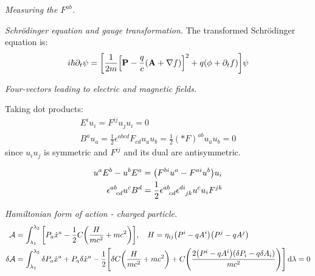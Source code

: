 \documentclass{report}
\begin{document}
\begin{subquests}
	\item \emph{Measuring the $F^{ab}$.}

	\item \emph{Schr\"odinger equation and gauge transformation.}
	The transformed Schr\"odinger equation is:
	\begin{align*}
		i\hbar\partial_t \psi = \bqty{\frac{1}{2m}\bqty{\mathbf{P} - \frac{q}{c}\pqty{\mathbf A + \nabla f}}^2 + q\pqty{\phi + \partial_t f}}\psi
	\end{align*}

	\item \emph{Four-vectors leading to electric and magnetic fields.}
	\begin{subquests}
		\item Taking dot products:
		\begin{gather*}
			E^i u_i = F^{ij}u_j u_i = 0 \\
			B^a u_a = \frac{1}{2}\epsilon^{abcd}F_{cd}u_a u_b = \frac{1}{2}(*F)^{ab}u_a u_b = 0
		\end{gather*}
		since $u_i u_j$ is symmetric and $F^{ij}$ and its dual are antisymmetric.

		\item
		\begin{align*}
			u^a E^b - u^b E^a & = \pqty{F^{bi}u^a - F^{ai}u^b} u_i \\
			\epsilon^{ab}_{\;\;\;cd} u^c B^d & = \frac{1}{2}\epsilon^{ab}_{\;\;\;cd}\epsilon^{di}_{\;\;\;jk}u^c u_i F^{jk}
		\end{align*}
	\end{subquests}

	\item \emph{Hamiltonian form of action - charged particle.}
	\begin{align*}
		\mathcal A & = \int_{\lambda_1}^{\lambda_2} \bqty{P_a \dot x^a - \frac{1}{2}C\pqty{\frac{H}{mc^2} + mc^2}}, \quad H = \eta_{ij}\pqty{P^i - qA^i}\pqty{P^j - qA^j} \\
		\delta\mathcal A & = \int_{\lambda_1}^{\lambda_2}\delta P_a \dot x^a + P_a \delta\dot x^a -\frac{1}{2}\bqty{\delta C\pqty{\frac{H}{mc^2} + mc^2} + C\pqty{\frac{2\pqty{P^i - qA^i}\pqty{\delta P_i -q \delta A_i}}{mc^2}}} \dd{\lambda} = 0
	\end{align*}


\end{subquests}
\end{document}
